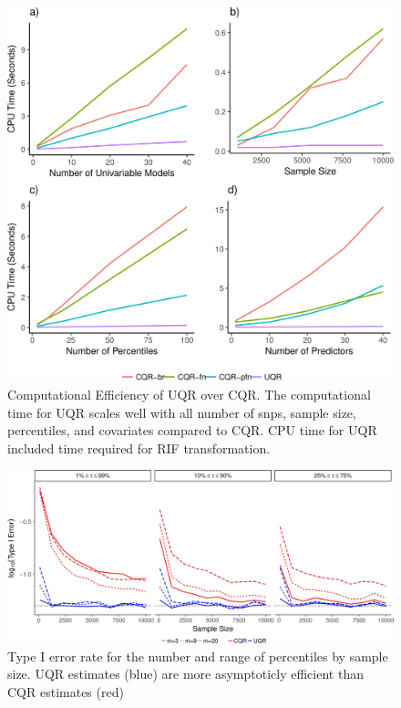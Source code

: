 \documentclass[12pt]{article}
\begin{document}
\begin{appendices}
\newpage
\begin{figure}[!h]
	\centering
	\includegraphics[width=1\textwidth, height=0.8\textwidth]{figures/CQRvsUQR_Speed.jpg}
	\caption{Computational Efficiency of UQR over CQR. The computational time for UQR scales well with all number of snps, sample size, percentiles, and covariates compared to CQR. CPU time for UQR included time required for RIF transformation.}
	\label{fig:CompEff}
\end{figure}

\newpage
\begin{landscape}
	\begin{figure}%
		\centering
		\includegraphics[width=1\textwidth, height=0.5\textwidth]{figures/ConvergenceDiag_Rate.jpg}
		\caption{Type I error rate for the number and range of percentiles by sample size. UQR estimates (blue) are more asymptoticly efficient than CQR estimates (red)} 
		\label{fig:FS1}
	\end{figure}
\end{landscape}
%


\end{appendices}
\end{document}
